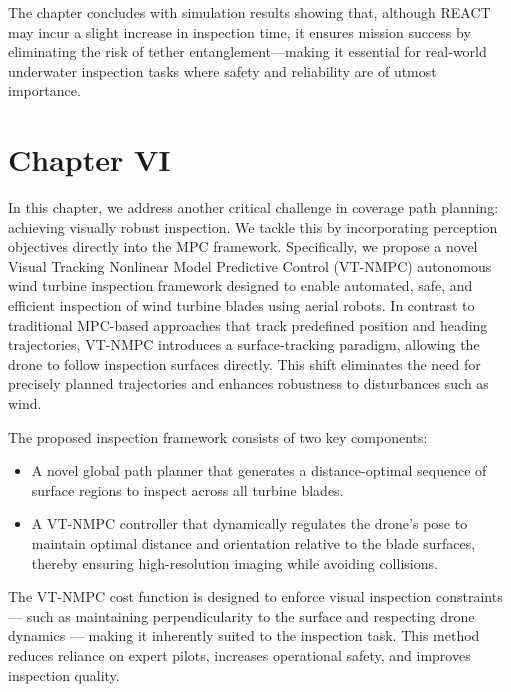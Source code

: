 The chapter concludes with simulation results showing that, although REACT may incur a slight increase in inspection time, it ensures mission success by eliminating the risk of tether entanglement—making it essential for real-world underwater inspection tasks where safety and reliability are of utmost importance. 



\section{Chapter VI}
\label{ch:vtnmpc}

In this chapter, we address another critical challenge in coverage path planning: achieving visually robust inspection. We tackle this by incorporating perception objectives directly into the MPC framework. Specifically, we propose a novel Visual Tracking Nonlinear Model Predictive Control (VT-NMPC) autonomous wind turbine inspection framework designed to enable automated, safe, and efficient inspection of wind turbine blades using aerial robots. In contrast to traditional MPC-based approaches that track predefined position and heading trajectories, VT-NMPC introduces a surface-tracking paradigm, allowing the drone to follow inspection surfaces directly. This shift eliminates the need for precisely planned trajectories and enhances robustness to disturbances such as wind.

The proposed inspection framework consists of two key components:
\begin{itemize}
    
\item A novel global path planner that generates a distance-optimal sequence of surface regions to inspect across all turbine blades.

\item  A VT-NMPC controller that dynamically regulates the drone’s pose to maintain optimal distance and orientation relative to the blade surfaces, thereby ensuring high-resolution imaging while avoiding collisions.

\end{itemize}

The VT-NMPC cost function is designed to enforce visual inspection constraints — such as maintaining perpendicularity to the surface and respecting drone dynamics — making it inherently suited to the inspection task. This method reduces reliance on expert pilots, increases operational safety, and improves inspection quality.

